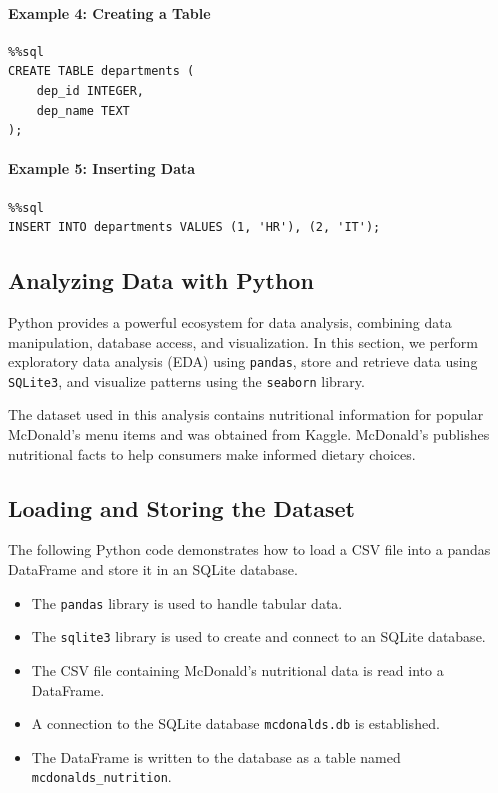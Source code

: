 \documentclass{article}
\begin{document}
\paragraph{Example 4: Creating a Table}
\begin{verbatim}
%%sql
CREATE TABLE departments (
    dep_id INTEGER,
    dep_name TEXT
);
\end{verbatim}

\paragraph{Example 5: Inserting Data}
\begin{verbatim}
%%sql
INSERT INTO departments VALUES (1, 'HR'), (2, 'IT');
\end{verbatim}

\subsection{Analyzing Data with Python}

Python provides a powerful ecosystem for data analysis, combining data manipulation, database access, and visualization. In this section, we perform exploratory data analysis (EDA) using \texttt{pandas}, store and retrieve data using \texttt{SQLite3}, and visualize patterns using the \texttt{seaborn} library.

The dataset used in this analysis contains nutritional information for popular McDonald's menu items and was obtained from Kaggle. McDonald's publishes nutritional facts to help consumers make informed dietary choices.

\subsection{Loading and Storing the Dataset}
The following Python code demonstrates how to load a CSV file into a pandas DataFrame and store it in an SQLite database.

\begin{itemize}
    \item The \texttt{pandas} library is used to handle tabular data.
    \item The \texttt{sqlite3} library is used to create and connect to an SQLite database.
    \item The CSV file containing McDonald's nutritional data is read into a DataFrame.
    \item A connection to the SQLite database \texttt{mcdonalds.db} is established.
    \item The DataFrame is written to the database as a table named \texttt{mcdonalds\_nutrition}.
\end{itemize}
\end{document}
